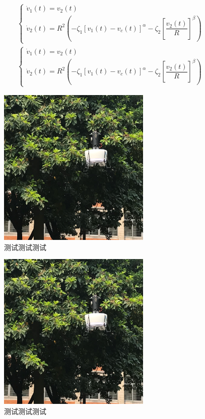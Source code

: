 \begin{align}
\left\{\begin{array}{l}
\dot{v}_{1}(t)=v_{2}(t) \\
\dot{v}_{2}(t)=R^{2}\left(-\zeta_{1}\left[v_{1}(t)-v_c(t)\right]^{\alpha}-\zeta_{2}\left[\dfrac{v_{2}(t)}{R}\right]^{\beta}\right)
\end{array}\right.	
\end{align}
\begin{align}
\left\{\begin{array}{l}
\dot{v}_{1}(t)=v_{2}(t) \\
\dot{v}_{2}(t)=R^{2}\left(-\zeta_{1}\left[v_{1}(t)-v_c(t)\right]^{\alpha}-\zeta_{2}\left[\dfrac{v_{2}(t)}{R}\right]^{\beta}\right)
\end{array}\right.	
\end{align}
\begin{figure}[htbp]
	\centering	
	\includegraphics[scale=1]{Fig/DFUAV_f31.png}
	\caption{\label{fig_c1}测试测试测试}
\end{figure}
\begin{figure}[htbp]
	\centering	
	\includegraphics[scale=1]{Fig/DFUAV_f31.png}
	\caption{\label{fig_c2}测试测试测试}
\end{figure}

